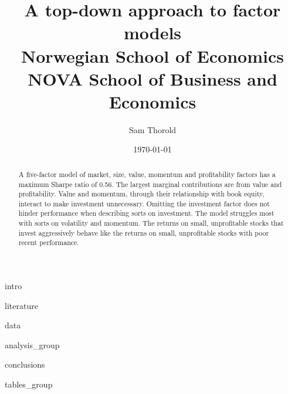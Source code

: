 \documentclass[a4paper, 12pt]{article}
\title{
  {A top-down approach to factor models}\\
  {\large Norwegian School of Economics}\\
  {\large NOVA School of Business and Economics}
}
\author{Sam Thorold}
\date{\today}
\begin{document}
\maketitle


\begin{abstract}
  A five-factor model of
  market, size, value, momentum and profitability factors
  has a maximum Sharpe ratio of 0.56.
  The largest marginal contributions are from value and profitability.
  Value and momentum, through their relationship with book equity,
  interact to make investment unnecessary.
  Omitting the investment factor does not hinder performance when describing
  sorts on investment.
  The model struggles most with sorts on volatility and momentum.
  The returns on small, unprofitable stocks that invest aggressively behave
  like the returns on small, unprofitable stocks with poor recent performance.
\end{abstract}

\pagebreak

{intro}

{literature}

{data}

{analysis_group}

{conclusions}


\printbibliography

\appendix

{tables_group}

\end{document}
